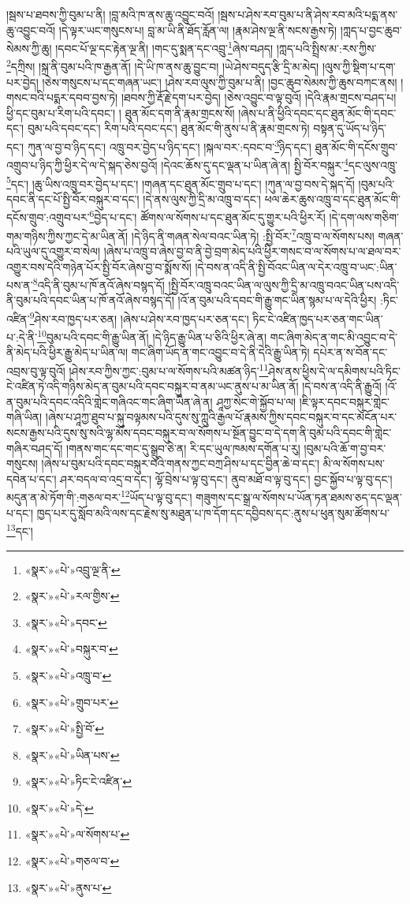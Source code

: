 །སྦས་པ་ཐབས་ཀྱི་བུམ་པ་ནི། །བླ་མའི་ཁ་ནས་ཆུ་འབྱུང་བའོ། །སྦས་པ་ཤེས་རབ་བུམ་པ་ནི་ཤེས་རབ་མའི་པདྨ་ནས་ཆུ་འབྱུང་བའོ། །དེ་ལྟར་ཡང་གསུངས་པ། བླ་མ་ཡི་ནི་ཐོད་རློན་ལ། །རྣམ་ཤེས་ལྔ་ནི་སངས་རྒྱས་ཏེ། །ཀླད་པ་བྱང་ཆུབ་སེམས་ཀྱི་ཆུ། །དབང་པོ་ལྔ་དང་རྟེན་ལྔ་ནི། །གང་དུ་སྨན་དང་འབྲུ་\footnote{«སྣར་»«པེ་»འབྲུ་ལྔ་ནི་}ཞེས་བཤད། །ཀླད་པའི་སྤྲིས་མ་:རས་ཀྱིས་\footnote{«སྣར་»«པེ་»རལ་གྱིས་}དཀྲིས། །སྐྲ་ནི་བུམ་པའི་ཁ་རྒྱན་ནོ། །དེ་ཡི་ཁ་ནས་ཆུ་བྱུང་བ། །ཡེ་ཤེས་བདུད་རྩི་དྲི་མ་མེད། །ལུས་ཀྱི་སྡིག་པ་དག་པར་བྱེད། །ཅེས་གསུངས་པ་དང་གཞན་ཡང་། །ཤེས་རབ་ལུས་ཀྱི་བུམ་པ་ནི། །བྱང་ཆུབ་སེམས་ཀྱི་ཆུས་བཀང་ནས། །གསང་བའི་པདྨར་དབབ་བྱས་ཏེ། །ཐབས་ཀྱི་རྡོ་རྗེ་དག་པར་བྱེད། །ཅེས་འབྱུང་བ་ལྟ་བུའོ། །དེའི་རྣམ་གྲངས་བཤད་པ། ཕྱི་དང་བུམ་པ་རིག་པའི་དབང་། །
ཐུན་མོང་དག་ནི་རྣམ་གྲངས་སོ། །ཞེས་པ་ནི་ཕྱིའི་དབང་དང་ཐུན་མོང་གི་དབང་དང་། བུམ་པའི་དབང་དང་། རིག་པའི་དབང་དང་། ཐུན་མོང་གི་ནུས་པ་ནི་རྣམ་གྲངས་ཏེ། བསྟན་དུ་ཡོད་པ་ཉིད་དང་། ཀུན་ལ་བྱ་བ་ཉིད་དང་། འཁྲུ་བར་བྱེད་པ་ཉིད་དང་། །སྐལ་བར་:དབང་བ་\footnote{«སྣར་»«པེ་»དབང་}ཉིད་དང་། ཐུན་མོང་གི་དངོས་གྲུབ་འགྲུབ་པ་ཉིད་ཀྱི་ཕྱིར་དེ་ལ་དེ་སྐད་ཅེས་བྱའོ། །དེའང་ཆོས་དུ་དང་ལྡན་པ་ཡིན་ཞེ་ན། སྤྱི་བོར་བསྐུར་\footnote{«སྣར་»«པེ་»བསྐུར་བ་}དང་ལུས་འཁྲུ་\footnote{«སྣར་»«པེ་»འཁྲུ་བ་}དང་། །ཆུ་ཡིས་འཁྲུ་བར་བྱེད་པ་དང་། །གཞན་དང་ཐུན་མོང་གྲུབ་པ་དང་། །ཀུན་ལ་བྱ་བས་དེ་སྐད་དོ། །བུམ་པའི་དབང་ནི་དང་པོ་སྤྱི་བོར་བསྐུར་བ་དང་། །དེ་ནས་ལུས་ཀྱི་དྲི་མ་འཁྲུ་བ་དང་། ཕལ་ཆེར་ཆུས་འཁྲུ་བ་དང་ཐུན་མོང་གི་དངོས་གྲུབ་:འགྲུབ་པར་\footnote{«སྣར་»«པེ་»གྲུབ་པར་}བྱེད་པ་དང་། ཚོགས་ལ་སོགས་པ་དང་ཐུན་མོང་དུ་གྱུར་པའི་ཕྱིར་རོ། །དེ་དག་ལས་གཅིག་གམ་གཉིས་ཀྱིས་ཀྱང་དེ་མ་ཡིན་ནོ། །དེ་ཉིད་ནི་གཞན་སེལ་བའང་ཡིན་ཏེ། :སྤྱི་བོར་\footnote{«སྣར་»«པེ་»སྤྱི་བོ་}འཁྲུ་བ་ལ་སོགས་པས། གཞན་པའི་ཡུལ་དུ་འགྱུར་བ་སེལ། །ཞེས་པ་འཁྲུ་བ་ཞེས་བྱ་བ་ནི་བྱེ་བྲག་མེད་པའི་ཕྱིར་གསང་བ་ལ་སོགས་པ་ལ་ཐལ་བར་འགྱུར་བས་དེའི་གཉེན་པོར་སྤྱི་བོར་ཞེས་བྱ་བ་སྨོས་སོ། །དེ་བས་ན་འདི་ནི་སྤྱི་བོའང་ཡིན་ལ་དེར་འཁྲུ་བ་ཡང་:ཡིན་པས་ན་\footnote{«སྣར་»«པེ་»ཡིན་པས་}འདི་ནི་བུམ་པ་ཁོ་ནའོ་ཞེས་བསྙད་དོ། །སྤྱི་བོར་འཁྲུ་བའང་ཡིན་ལ་ལུས་ཀྱི་དྲི་མ་འཁྲུ་བའང་ཡིན་པས་འདི་ནི་བུམ་པའི་དབང་ཡིན་པ་ཁོ་ནའོ་ཞེས་བསྙད་དོ། །འོ་ན་བུམ་པའི་དབང་གི་རྒྱུ་གང་ཡིན་སྙམ་པ་ལ་དེའི་ཕྱིར། :ཏིང་འཛིན་\footnote{«སྣར་»«པེ་»ཏིང་ངེ་འཛིན་}ཤེས་རབ་ཁྱད་པར་ཅན། །ཞེས་པ་ཤེས་རབ་ཁྱད་པར་ཅན་དང་། ཏིང་ངེ་འཛིན་ཁྱད་པར་ཅན་གང་ཡིན་པ་:དེ་ནི་\footnote{«སྣར་»«པེ་»དེ་}བུམ་པའི་དབང་གི་རྒྱུ་ཡིན་ནོ། །དེ་ཉིད་རྒྱུ་ཡིན་པ་ཅིའི་ཕྱིར་ཞེ་ན། གང་ཞིག་མེད་ན་གང་མི་འབྱུང་བ་དེ་ནི་མེད་པའི་ཕྱིར་རྒྱུ་མེད་པ་ཡིན་ལ། གང་ཞིག་ཡོད་ན་གང་འབྱུང་བ་དེ་ནི་དེའི་རྒྱུ་ཡིན་ཏེ། དཔེར་ན་ས་བོན་དང་འབྲས་བུ་ལྟ་བུའོ། །ཤེས་རབ་ཀྱིས་ཀྱང་:བུམ་པ་ལ་སོགས་པའི་མཚན་ཉིད་\footnote{«སྣར་»«པེ་»ལ་སོགས་པ་}ཤེས་ནས་ཕྱིས་དེ་ལ་དམིགས་པའི་ཏིང་ངེ་འཛིན་ཏེ་འདི་གཉིས་མེད་ན་བུམ་པའི་དབང་བསྐུར་བ་ནམ་ཡང་ནུས་པ་མ་ཡིན་ནོ། །དེ་བས་ན་འདི་ནི་རྒྱུའོ། །འོ་ན་བུམ་པའི་དབང་འདིའི་གླེང་གཞིའང་གང་ཞིག་ཡིན་ཞེ་ན། ཤཱཀྱ་སེང་གེ་སྐྱོབ་པ་ལ། །ཇི་ལྟར་དབང་བསྐུར་གླེང་གཞི་ཡིན། །ཞེས་པ་ཤཱཀྱ་ཐུབ་པ་སྐུ་བལྟམས་པའི་དུས་སུ་ཀླུའི་རྒྱལ་པོ་རྣམས་ཀྱིས་དབང་བསྐུར་བ་དང་མངོན་པར་སངས་རྒྱས་པའི་དུས་སུ་སའི་ལྷ་མོས་དབང་བསྐུར་བ་ལ་སོགས་པ་སྔོན་བྱུང་བ་དེ་དག་ནི་བུམ་པའི་དབང་གི་གླེང་གཞིར་བཤད་དོ། །གནས་གང་དང་གང་དུ་སྒྲུབ་ཅེ་ན། རི་དང་ཡུལ་ཁམས་དགོན་པ་རུ། །བུམ་པའི་ཆོ་ག་བྱ་བར་གསུངས། །ཞེས་པ་བུམ་པའི་དབང་བསྐུར་བའི་གནས་ཀྱང་བཀྲ་ཤིས་པ་དང་བྱིན་ཆེ་བ་དང་། མི་ལ་སོགས་པས་དབེན་པ་དང་། ཤར་བདལ་བ་འདྲ་བ་དང་། ལྷོ་བྲེས་པ་ལྟ་བུ་དང་། ནུབ་མཐོ་བ་ལྟ་བུ་དང་། བྱང་སྐྱོབ་པ་ལྟ་བུ་དང་། མདུན་ན་མེ་ཏོག་གི་:གཅལ་བར་\footnote{«སྣར་»«པེ་»གཅལ་བ་}ཡོད་པ་ལྟ་བུ་དང་། གཟུགས་དང་སྒྲ་ལ་སོགས་པ་ཡོན་ཏན་ཐམས་ཅད་དང་ལྡན་པ་དང་། ཁྱད་པར་དུ་སློབ་མའི་ལས་དང་རྗེས་སུ་མཐུན་པ་ཁ་དོག་དང་དབྱིབས་དང་:ནུས་པ་ཕུན་སུམ་ཚོགས་པ་\footnote{«སྣར་»«པེ་»ནུས་པ་}དང་། 